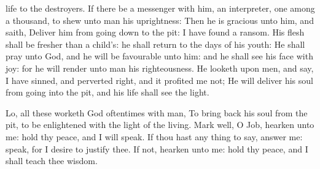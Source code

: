 {life to the
destroyers.
If
there be a
messenger with him, an
interpreter,
one among a
thousand, to
shew unto
man his
uprightness:
Then he is
gracious unto him, and
saith,
Deliver him from going
down to the
pit: I have
found a
ransom.
His
flesh shall be
fresher than a
child’s: he shall
return to the
days of his
youth:
He shall
pray unto
God, and he will be
favourable unto him: and he shall
see his
face with
joy: for he will
render unto
man his
righteousness.
He
looketh upon
men, and
{}
say, I have
sinned, and
perverted
{}
right, and it
profited me not;
He will
deliver his
soul from
going into the
pit, and his
life shall
see the
light.
\par }{\PP {}Lo, all these
{}
worketh
God
oftentimes with
man,
To bring
back his
soul from the
pit, to be
enlightened with the
light of the
living.
Mark
well, O
Job,
hearken unto me: hold thy
peace, and I will
speak.
If thou
hast any thing to
say,
answer me:
speak, for I
desire to
justify thee.
If not,
hearken unto me: hold thy
peace, and I shall
teach thee
wisdom.

}
